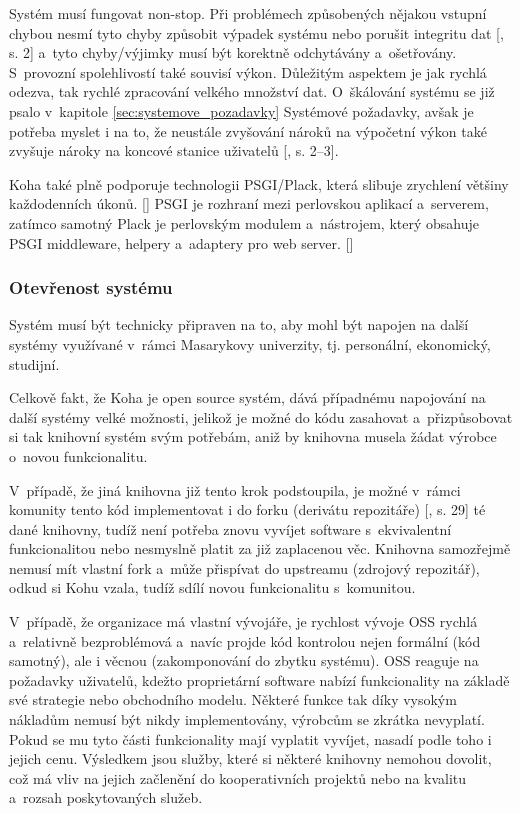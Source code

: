 \documentclass[
	11pt, oneside, printed, final, palatino
	microtype,
	table,   %
	lof,     %
	lot     %
]{fithesis3}
\newcommand{\citepages}[2]{[\cite{#2}, s. #1]}
\newcommand{\citesource}[1]{[\cite{#1}]}
\begin{document}
{Systém musí fungovat non-stop. Při problémech způsobených nějakou vstupní chybou nesmí tyto chyby způsobit výpadek systému nebo porušit integritu dat \citepages{2}{bartosek_2001_systemovy_pohled} a~tyto chyby/výjimky musí být korektně odchytávány a~ošetřovány. S~provozní spolehlivostí také souvisí výkon. Důležitým aspektem je jak rychlá odezva, tak rychlé zpracování velkého množství dat. O~škálování systému se již psalo v~kapitole \ref{sec:systemove_pozadavky} Systémové požadavky, avšak je potřeba myslet i na to, že neustále zvyšování nároků na výpočetní výkon také zvyšuje nároky na koncové stanice uživatelů \citepages{2–3}{bartosek_2001_systemovy_pohled}.

Koha také plně podporuje technologii PSGI/Plack, která slibuje zrychlení většiny každodenních úkonů. \citesource{koha_3.22_released_2016}
 PSGI je rozhraní mezi perlovskou aplikací a~serverem, zatímco samotný Plack je perlovským modulem a~nástrojem, který obsahuje PSGI middleware, helpery a~adaptery pro web server.  \citesource{psgi/plack_2016}

\subsubsection{{\large Otevřenost systému}}
Systém musí být technicky připraven na to, aby mohl být napojen na další systémy využívané v~rámci Masarykovy univerzity, tj. personální, ekonomický, studijní.

Celkově fakt, že Koha je open source systém, dává případnému napojování na další systémy velké možnosti, jelikož je možné do kódu zasahovat a~přizpůsobovat si tak knihovní systém svým potřebám, aniž by knihovna musela žádat výrobce o~novou funkcionalitu.

V~případě, že jiná knihovna již tento krok podstoupila, je možné v~rámci komunity tento kód  implementovat i do forku (derivátu repozitáře) \citepages{29}{Chaconc2009} té dané knihovny, tudíž není potřeba znovu vyvíjet software s~ekvivalentní funkcionalitou nebo nesmyslně platit za již zaplacenou věc. Knihovna samozřejmě nemusí mít vlastní fork a~může přispívat do upstreamu (zdrojový repozitář), odkud si Kohu vzala, tudíž sdílí novou funkcionalitu s~komunitou.

V~případě, že organizace má vlastní vývojáře, je rychlost vývoje OSS rychlá a~relativně bezproblémová a~navíc projde kód kontrolou nejen formální (kód samotný), ale i věcnou (zakomponování do zbytku systému). OSS reaguje na požadavky uživatelů, kdežto proprietární software nabízí funkcionality na základě své strategie nebo obchodního modelu. Některé funkce tak díky vysokým nákladům nemusí být nikdy implementovány, výrobcům se zkrátka nevyplatí. Pokud se mu tyto části funkcionality mají vyplatit vyvíjet, nasadí podle toho i jejich cenu. Výsledkem jsou služby, které si některé knihovny nemohou dovolit, což má vliv na jejich začlenění do kooperativních projektů nebo na kvalitu a~rozsah poskytovaných služeb.

}
\end{document}
